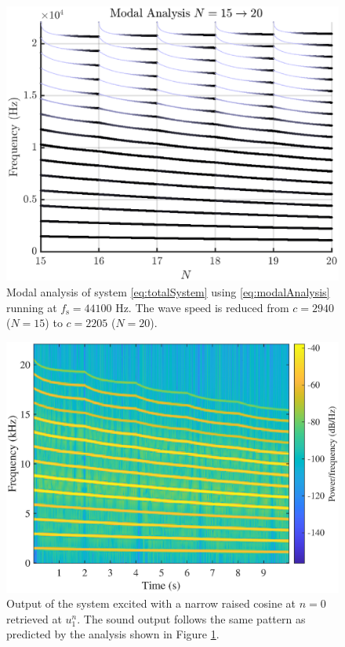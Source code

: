\begin{figure}[t]
    \centering
\includegraphics[width=\figwidth\columnwidth]{Figures/modalAnalysisDamping.eps}
\caption{\label{fig:modalAnalysis}{Modal analysis of system \eqref{eq:totalSystem} using \eqref{eq:modalAnalysis} running at $f_\text{s} = 44100$ Hz. The wave speed is reduced from $c = 2940$ ($N = 15$) to $c = 2205$ ($N = 20$).}}
\end{figure} 
\begin{figure}[t]
    \centering
\includegraphics[width=\figwidth\columnwidth]{Figures/specQuadratic.eps}
\caption{\label{fig:spectrogram}{Output of the system excited with a narrow raised cosine at $n=0$ retrieved at $u_1^n$. The sound output follows the same pattern as predicted by the analysis shown in Figure \ref{fig:modalAnalysis}.}}
\end{figure} 

